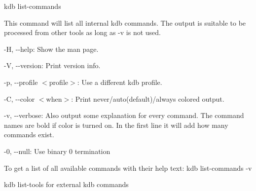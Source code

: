 {\ttfamily kdb list-\/commands}

This command will list all internal kdb commands. The output is suitable to be processed from other tools as long as {\ttfamily -\/v} is not used.


\begin{DoxyItemize}
\item {\ttfamily -\/H}, {\ttfamily -\/-\/help}\+: Show the man page.
\item {\ttfamily -\/V}, {\ttfamily -\/-\/version}\+: Print version info.
\item {\ttfamily -\/p}, {\ttfamily -\/-\/profile $<$profile$>$}\+: Use a different kdb profile.
\item {\ttfamily -\/C}, {\ttfamily -\/-\/color $<$when$>$}\+: Print never/auto(default)/always colored output.
\item {\ttfamily -\/v}, {\ttfamily -\/-\/verbose}\+: Also output some explanation for every command. The command names are bold if color is turned on. In the first line it will add how many commands exist.
\item {\ttfamily -\/0}, {\ttfamily -\/-\/null}\+: Use binary 0 termination
\end{DoxyItemize}

To get a list of all available commands with their help text\+: {\ttfamily kdb list-\/commands -\/v}


\begin{DoxyItemize}
\item {\ttfamily kdb list-\/tools} for external kdb commands 
\end{DoxyItemize}